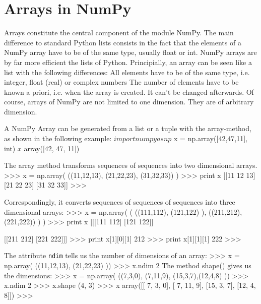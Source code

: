\section{Arrays in NumPy}
Arrays constitute the central component of the module NumPy. 
The main difference to standard Python lists consists in the fact that the elements of a NumPy array have to be of the same type, usually float or int. NumPy arrays are by far more efficient the lists of Python. Principially, an array can be seen like a list with the following differences:
All elements have to be of the same type, i.e. integer, float (real) or complex numbers
The number of elements have to be known a priori, i.e. when the array is created. It can't be changed afterwards.
Of course, arrays of NumPy are not limited to one dimension. They are of arbitrary dimension. 

A NumPy Array can be generated from a list or a tuple with the array-method, as shown in the following example: 
$ import numpy as np
$ x = np.array([42,47,11], int)
$ x
$ array([42, 47, 11])

The array method transforms sequences of sequences into two dimensional arrays.
>>> x = np.array( ((11,12,13), (21,22,23), (31,32,33)) )
>>> print x
[[11 12 13]
 [21 22 23]
 [31 32 33]]
>>> 

Correspondingly, it converts sequences of sequences of sequences into three dimensional arrays:
>>> x = np.array( ( ((111,112), (121,122) ), ((211,212),(221,222)) ) )
>>> print x
[[[111 112]
  [121 122]]

 [[211 212]
  [221 222]]]
>>> print x[1][0][1]
212
>>> print x[1][1][1]
222
>>> 

The attribute \texttt{ndim} tells us the number of dimensions of an array:
>>> x = np.array( ((11,12,13), (21,22,23) ))
>>> x.ndim
2
The method shape() gives us the dimensions:
>>> x = np.array( ((7,3,0), (7,11,9), (15,3,7),(12,4,8)  ))
>>> x.ndim
2
>>> x.shape
(4, 3)
>>> x
array([[ 7,  3,  0],
       [ 7, 11,  9],
       [15,  3,  7],
       [12,  4,  8]])
>>> 






